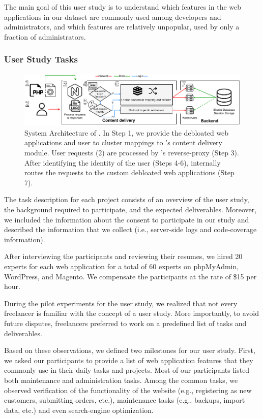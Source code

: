 The main goal of this user study is to understand which features in the web applications in our dataset are commonly used among developers and administrators, and which features are relatively unpopular, used by only a fraction of administrators.

\subsubsection{User Study Tasks}

\begin{figure}[h]
    \centering
    \includegraphics[width=0.95\columnwidth]{figures/dbltr/RoleModelsFlow.pdf}
    \caption{System Architecture of \dbltr{}. In Step 1, we provide the debloated web applications and user to cluster mappings to \dbltr{}'s content delivery module. User requests (2) are processed by \dbltr{}'s reverse-proxy (Step 3). After identifying the identity of the user (Steps 4-6), \dbltr{} internally routes the requests to the custom debloated web applications (Step 7).}
	\label{fig:system_architecture}
\end{figure}

The task description for each project consists of an overview of the user study, the background required to participate, and the expected deliverables. 
Moreover, we included the information about the consent to participate in our study and described the information that we collect (i.e., server-side logs and code-coverage information). 

After interviewing the participants and reviewing their resumes, we hired 20 experts for each web application for a total of 60 experts on phpMyAdmin, WordPress, and Magento. 
We compensate the participants at the rate of \$15 per hour.

During the pilot experiments for the user study, we realized that not every freelancer is familiar with the concept of a user study. 
More importantly, to avoid future disputes, freelancers preferred to work on a predefined list of tasks and deliverables. 

Based on these observations, we defined two milestones for our user study. 
First, we asked our participants to provide a list of web application features that they commonly use in their daily tasks and projects. 
Most of our participants listed both maintenance and administration tasks. 
Among the common tasks, we observed verification of the functionality of the website (e.g., registering as new customers, submitting orders, etc.), maintenance tasks (e.g., backups, import data, etc.) and even search-engine optimization. 

